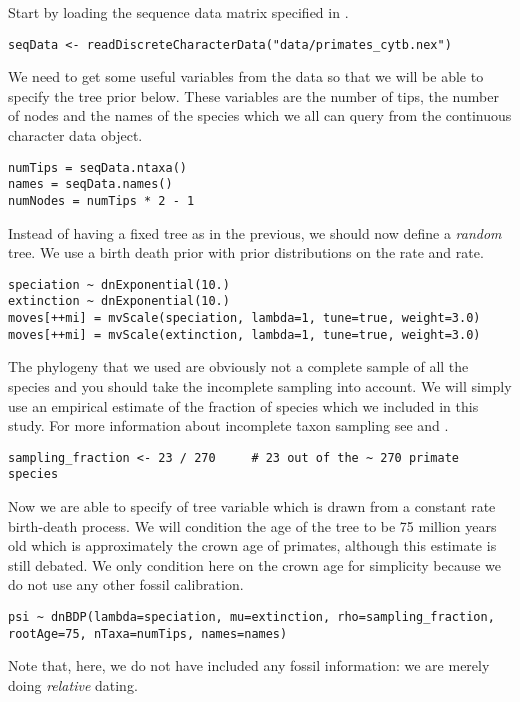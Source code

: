 Start by loading the sequence data matrix specified in .
{\tt \begin{snugshade*}
\begin{lstlisting}
seqData <- readDiscreteCharacterData("data/primates_cytb.nex")
\end{lstlisting}
\end{snugshade*}}

We need to get some useful variables from the data so that we will be able to specify the tree prior below. These variables are the number of tips, the number of nodes and the names of the species which we all can query from the continuous character data object.
{\tt \small \begin{snugshade*}
\begin{lstlisting}
numTips = seqData.ntaxa()
names = seqData.names()
numNodes = numTips * 2 - 1
\end{lstlisting}
\end{snugshade*}}

Instead of having a fixed tree as in the previous, we should now define a \emph{random} tree. We use a birth death prior with prior distributions on the  rate and  rate.
{\tt \small \begin{snugshade*}
\begin{lstlisting}
speciation ~ dnExponential(10.)
extinction ~ dnExponential(10.)
moves[++mi] = mvScale(speciation, lambda=1, tune=true, weight=3.0)
moves[++mi] = mvScale(extinction, lambda=1, tune=true, weight=3.0)
\end{lstlisting}
\end{snugshade*}}
The phylogeny that we used are obviously not a complete sample of all the species and you should take the incomplete sampling into account. We will simply use an empirical estimate of the fraction of species which we included in this study. For more information about incomplete taxon sampling see \cite{Hohna2011} and \cite{Hohna2014a}. 
{\tt \small \begin{snugshade*}
\begin{lstlisting}
sampling_fraction <- 23 / 270     # 23 out of the ~ 270 primate species
\end{lstlisting}
\end{snugshade*}}
Now we are able to specify of tree variable  which is drawn from a constant rate birth-death process. We will condition the age of the tree to be 75 million years old which is approximately the crown age of primates, although this estimate is still debated. We only condition here on the crown age for simplicity because we do not use any other fossil calibration.
{\tt \small \begin{snugshade*}
\begin{lstlisting}
psi ~ dnBDP(lambda=speciation, mu=extinction, rho=sampling_fraction, rootAge=75, nTaxa=numTips, names=names)
\end{lstlisting}
\end{snugshade*}}
Note that, here, we do not have included any fossil information: we are merely doing \emph{relative} dating. 

